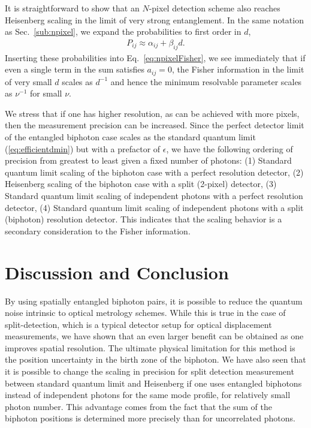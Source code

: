 It is straightforward to show that an $N$-pixel detection scheme also reaches Heisenberg scaling in the limit of very strong entanglement.  
In the same notation as Sec.~\ref{sub:npixel}, we expand the probabilities to first order in $d$,
\begin{align}
P_{ij} \approx \alpha_{ij} + \beta_{ij} d.
\end{align}
Inserting these probabilities into Eq.~\eqref{eq:npixelFisher}, we see immediately that if even a single term in the sum satisfies $a_{ij} = 0$, the Fisher information in the limit of very small $d$ scales as $d^{-1}$ and hence the minimum resolvable parameter scales as $\nu^{-1}$ for small $\nu$.

We stress that if one has higher resolution, as can be achieved with more pixels, then the measurement precision can be increased.  Since the perfect detector limit of the entangled biphoton case scales as the standard quantum limit (\ref{eq:efficientdmin}) but with a prefactor of $\epsilon$, we have the following ordering of precision from greatest to least given a fixed number of photons: (1) Standard quantum limit scaling of the biphoton case with a perfect resolution detector, (2) Heisenberg scaling of the biphoton case with a split (2-pixel) detector, (3)  Standard quantum limit scaling of independent photons with a perfect resolution detector, (4)  Standard quantum limit scaling of independent photons with a split (biphoton) resolution detector.  This indicates that the scaling behavior is a secondary consideration to the Fisher information. 

\section{Discussion and Conclusion}\label{sec:conclusion}
By using spatially entangled biphoton pairs, it is possible to reduce the quantum noise intrinsic to optical metrology schemes.  
While this is true in the case of split-detection, which is a typical detector setup for optical displacement measurements, we have shown that an even larger benefit can be obtained as one improves spatial resolution.   The ultimate physical limitation for this method is the position uncertainty in the birth zone of the biphoton.  We have also seen that it is possible to change the scaling in precision for split detection measurement between standard quantum limit and Heisenberg if one uses entangled biphotons instead of independent photons for the same mode profile, for relatively small photon number.  
This advantage comes from the fact that the sum of the biphoton positions is determined more precisely than for uncorrelated photons.

